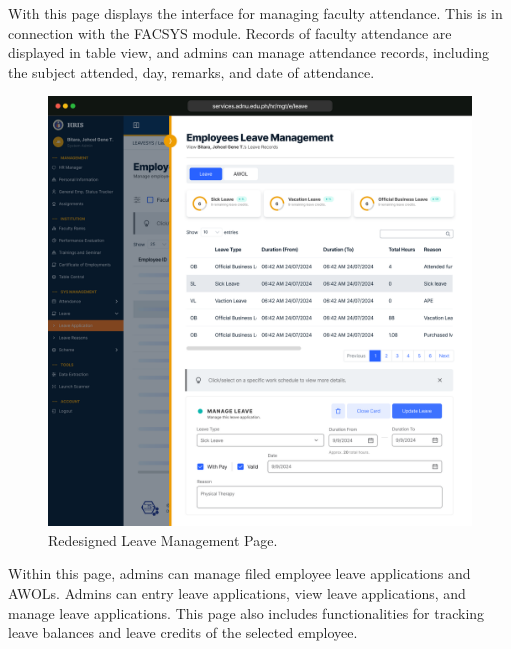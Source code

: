     With this page displays the interface for managing faculty attendance. This is in connection with the FACSYS module. Records of faculty attendance are displayed in table view, and admins can manage attendance records, including the subject attended, day, remarks, and date of attendance.

    \begin{figure}[H]
        \centering
        \includegraphics[width=1\linewidth]{figures/app/leave-mgt.png}
        \caption{Redesigned Leave Management Page.}
        \label{fig:leave-mgt}
    \end{figure}

    Within this page, admins can manage filed employee leave applications and AWOLs. Admins can entry leave applications, view leave applications, and manage leave applications. This page also includes functionalities for tracking leave balances and leave credits of the selected employee.

